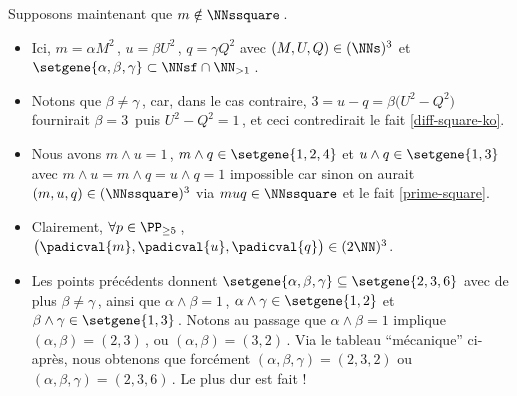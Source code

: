 Supposons maintenant que $m \notin \NNssquare$\,.
%
\begin{itemize}
	\item Ici, $m = \alpha M^2$\,, $u = \beta U^2$\,, $q = \gamma Q^2$ avec $(M, U, Q) \in ( \NNs )^3$ et $\setgene{\alpha, \beta, \gamma} \subset \NNsf \cap \NN_{>1}$\,.


	\item Notons que $\beta \neq \gamma$\,, car, dans le cas contraire, $3 = u - q = \beta \big( U^2 - Q^2 \big)$ fournirait $\beta = 3$\, puis $U^2 - Q^2 = 1$\,, et ceci contredirait le fait \ref{diff-square-ko}.


	\item Nous avons $m \wedge u = 1$\,, $m \wedge q \in \setgene{1, 2, 4}$ et $u \wedge q \in \setgene{1, 3}$
	avec $m \wedge u = m \wedge q = u \wedge q = 1$ impossible car sinon on aurait $(m, u, q) \in ( \NNssquare )^3$ via $muq \in \NNssquare$ et le fait \ref{prime-square}.


	\item Clairement, $\forall p \in \PP_{\geq 5}$\,, $\big( \padicval{m} , \padicval{u} , \padicval{q} \big) \in ( 2 \NN )^3$.


	\item Les points précédents donnent 
	$\setgene{\alpha, \beta, \gamma} \subseteq \setgene{2, 3, 6}$
	avec de plus
	$\beta \neq \gamma$\,,
	ainsi que 
	$\alpha \wedge \beta = 1$\,, $\alpha \wedge \gamma \in \setgene{1, 2}$ et $\beta \wedge \gamma \in \setgene{1, 3}$\,.
	Notons au passage que $\alpha \wedge \beta = 1$ implique $(\alpha, \beta) = (2, 3)$\,, ou $(\alpha, \beta) = (3, 2)$\,.
	Via le tableau \enquote{mécanique} ci-après, nous obtenons que forcément $(\alpha, \beta, \gamma) = (2, 3, 2)$ ou $(\alpha, \beta, \gamma) = (2, 3, 6)$\,. Le plus dur est fait !
\end{itemize}

\begin{center}
\end{center}


